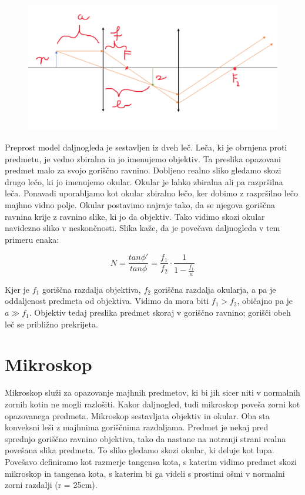 \documentclass[a4paper]{report}
\begin{document}
\begin{figure}[htp]
    \centering
    \includegraphics[width=\textwidth]{Daljnogled.png}

\end{figure}

\noindent Preprost model daljnogleda je sestavljen iz dveh leč. Leča, ki je obrnjena proti predmetu, je vedno zbiralna in jo imenujemo objektiv. Ta preslika opazovani predmet malo za svojo goriščno ravnino. Dobljeno realno sliko gledamo skozi drugo lečo, ki jo imenujemo okular. Okular je lahko zbiralna ali pa razpršilna leča. Ponavadi uporabljamo kot okular zbiralno lečo, ker dobimo z razpršilno lečo majhno vidno polje. Okular postavimo najraje tako, da se njegova goriščna ravnina krije z ravnino slike, ki jo da objektiv. Tako vidimo skozi okular navidezno sliko v neskončnosti. Slika kaže, da je povečava daljnogleda v tem primeru enaka:  

\[N=\frac{tan\phi'}{tan\phi}=\frac{f_1}{f_2}\cdot \frac{1}{1-\frac{f_1}{a}}\]

Kjer je $f_1$ goriščna razdalja objektiva, $f_2$ goriščna razdalja okularja, a pa je oddaljenost predmeta od objektiva. Vidimo da mora biti $f_1 > f_2$, običajno pa
je $a \gg f_1$. Objektiv tedaj preslika predmet skoraj v goriščno ravnino; gorišči
obeh leč se približno prekrijeta.

\section*{Mikroskop}
Mikroskop služi za opazovanje majhnih predmetov, ki bi jih sicer niti v normalnih zornih kotin ne mogli razlošiti. Kakor daljnogled, tudi mikroskop poveša zorni kot opazovanega predmeta. Mikroskop sestavljata objektiv in okular. Oba sta konveksni leši z majhnima goriščnima razdaljama. Predmet je nekaj pred sprednjo goriščno ravnino objektiva, tako da nastane na notranji strani realna povešana slika predmeta. To sliko gledamo skozi okular, ki deluje kot lupa. Povešavo definiramo kot razmerje tangensa kota, s katerim vidimo predmet skozi mikroskop in tangensa kota, s katerim bi ga videli s prostimi ošmi v normalni
zorni razdalji (r = 25cm).
\end{document}
